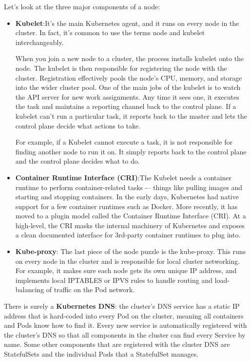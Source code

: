 \documentclass[10pt,a4paper]{report}
\begin{document}
Let’s look at the three major components of a node:

\begin{itemize}
	\item \textbf{Kubelet}:It’s the main Kubernetes agent, and it runs on every node in the cluster. In fact, it’s common to use the terms node and kubelet interchangeably.
	
	When you join a new node to a cluster, the process installs kubelet onto the node. The kubelet is then responsible for registering the node with the cluster. Registration effectively pools the node’s CPU, memory, and storage into the wider cluster pool.
	One of the main jobs of the kubelet is to watch the API server for new work assignments. Any time it sees one, it executes the task and maintains a reporting channel back to the control plane.
	If a kubelet can’t run a particular task, it reports back to the master and lets the control plane decide what actions to take. 
	
	For example, if a Kubelet cannot execute a task, it is not responsible for finding another node to run it on. It simply reports back to the control plane and the control plane decides what to do.
	
	\item \textbf{Container Runtime Interface (CRI)}:The Kubelet needs a container runtime to perform container-related tasks -– things like pulling images and starting and stopping containers.
	In the early days, Kubernetes had native support for a few container runtimes such as Docker. More recently, it has moved to a plugin model called the Container Runtime Interface (CRI). At a high-level, the CRI masks the internal machinery of Kubernetes and exposes a clean documented interface for 3rd-party container runtimes to plug into.
	
	\item \textbf{Kube-proxy}:
	The last piece of the node puzzle is the kube-proxy. This runs on every node in the cluster and is responsible for local cluster networking. For example, it makes sure each node gets its own unique IP address, and implements local IPTABLES or IPVS rules to handle routing and load-balancing of traffic on the Pod network.
\end{itemize}

There is surely a \textbf{Kubernetes DNS}: the cluster’s DNS service has a static IP address that is hard-coded into every Pod on the cluster, meaning all containers and Pods know how to find it. Every new service is automatically registered with the cluster’s DNS so that all components in the cluster can find every Service by name. Some other components that are registered with the cluster DNS are StatefulSets and the individual Pods that a StatefulSet manages.
\end{document}
